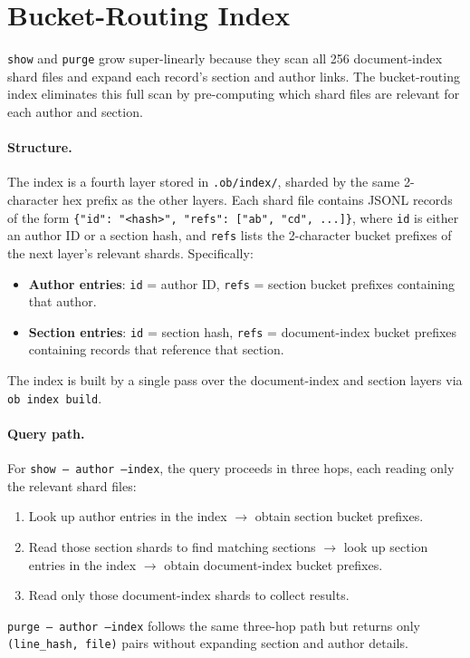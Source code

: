 \section{Bucket-Routing Index}
\label{sec:index}

\texttt{show} and \texttt{purge} grow super-linearly because they scan all 256 document-index shard files and expand each record's section and author links. The bucket-routing index eliminates this full scan by pre-computing which shard files are relevant for each author and section.

\paragraph{Structure.}
The index is a fourth layer stored in \texttt{.ob/index/}, sharded by the same 2-character hex prefix as the other layers. Each shard file contains JSONL records of the form \texttt{\{"id": "<hash>", "refs": ["ab", "cd", ...]\}}, where \texttt{id} is either an author ID or a section hash, and \texttt{refs} lists the 2-character bucket prefixes of the next layer's relevant shards. Specifically:
\begin{itemize}
	\item \textbf{Author entries}: \texttt{id} = author ID, \texttt{refs} = section bucket prefixes containing that author.
	\item \textbf{Section entries}: \texttt{id} = section hash, \texttt{refs} = document-index bucket prefixes containing records that reference that section.
\end{itemize}
The index is built by a single pass over the document-index and section layers via \texttt{ob index build}.

\paragraph{Query path.}
For \texttt{show\,--\,author --index}, the query proceeds in three hops, each reading only the relevant shard files:
\begin{enumerate}
	\item Look up author entries in the index $\to$ obtain section bucket prefixes.
	\item Read those section shards to find matching sections $\to$ look up section entries in the index $\to$ obtain document-index bucket prefixes.
	\item Read only those document-index shards to collect results.
\end{enumerate}
\texttt{purge\,--\,author --index} follows the same three-hop path but returns only \texttt{(line\_hash, file)} pairs without expanding section and author details.

